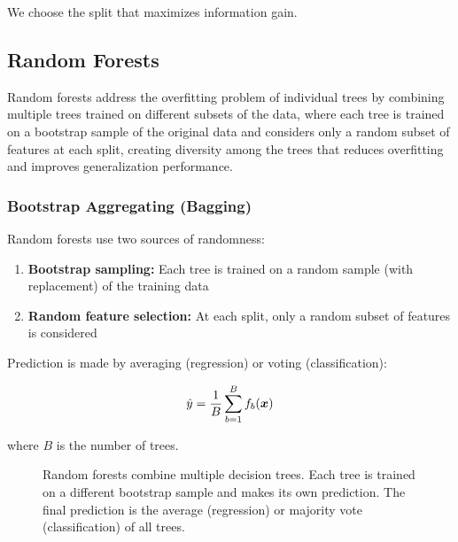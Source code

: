 We choose the split that maximizes information gain.

\subsection{Random Forests}

Random forests address the overfitting problem of individual trees by combining multiple trees trained on different subsets of the data, where each tree is trained on a bootstrap sample of the original data and considers only a random subset of features at each split, creating diversity among the trees that reduces overfitting and improves generalization performance.

\subsubsection{Bootstrap Aggregating (Bagging)}

Random forests use two sources of randomness:

\begin{enumerate}
    \item \textbf{Bootstrap sampling:} Each tree is trained on a random sample (with replacement) of the training data
    \item \textbf{Random feature selection:} At each split, only a random subset of features is considered
\end{enumerate}

Prediction is made by averaging (regression) or voting (classification):

\begin{equation}
\hat{y} = \frac{1}{B} \sum_{b=1}^{B} f_b(\boldsymbol{x})
\end{equation}

where $B$ is the number of trees.

\begin{figure}[htbp]
\centering
{}
\caption{Random forests combine multiple decision trees. Each tree is trained on a different bootstrap sample and makes its own prediction. The final prediction is the average (regression) or majority vote (classification) of all trees.}
\label{fig:random-forest}
\end{figure}

